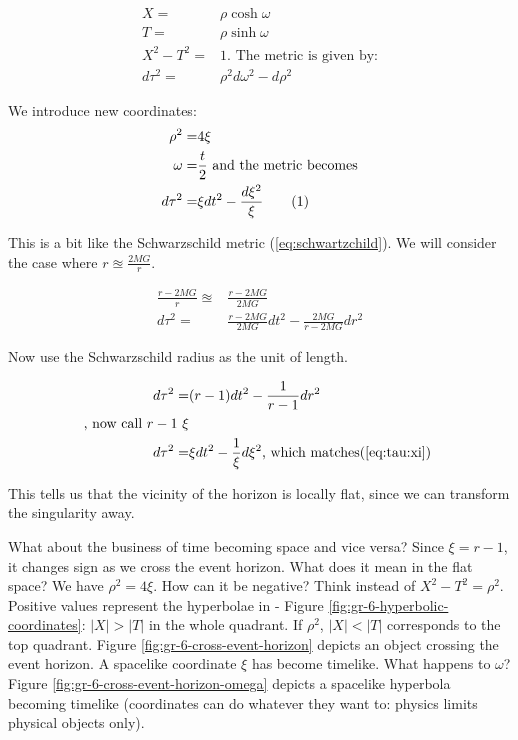 \documentclass[]{article}
\newcommand\numberthis{\addtocounter{equation}{1}\tag{\theequation}}
\begin{document}
{\begin{align*}
	X =& \rho \cosh{\omega} \\
	T =& \rho \sinh{\omega}\\
	X^2 - T^2 =& 1 \text{. The metric is given by:}\\
	d\tau^2 =& \rho^2 d\omega^2 - d \rho^2 
\end{align*}

We introduce new coordinates:
\begin{align*}
	\rho^2 =& 4 \xi\\
	\omega =& \frac{t}{2} \text{ and the metric becomes}\\
	d\tau^2 =& \xi dt^2 - \frac{d \xi^2}{\xi} \numberthis \label{eq:tau:xi}
\end{align*}

This is a bit like the Schwarzschild metric (\ref{eq:schwartzchild}). We will consider the case where $r \approxeq \frac{2MG}{r}$.

\begin{align*}
	\frac{r-2MG}{r} \approxeq & \frac{r-2MG}{2MG}\\
	d \tau^2 =& \frac{r-2MG}{2MG} dt^2 - \frac{2MG}{r-2MG}dr^2
\end{align*}

Now use the Schwarzschild radius as the unit of length.

\begin{align*}
	d \tau^2 =& (r-1) dt^2 - \frac{1}{r-1}dr^2\\ \text{, now call $r-1$ $\xi$}\\
	d \tau^2 =& \xi dt^2 - \frac{1}{\xi} d\xi^2 \text{, which matches(\ref{eq:tau:xi}) }
\end{align*}

This tells us that the vicinity of the horizon is locally flat, since we can transform the singularity away. 

What about the business of time becoming space and vice versa? Since $\xi=r-1$, it changes sign as we cross the event horizon. What does it mean in the flat space? We have $\rho^2 = 4 \xi$. How can it be negative? Think instead of $X^2-T^2=\rho^2$. Positive values represent the hyperbolae in - Figure \ref{fig:gr-6-hyperbolic-coordinates}: $\lvert X\rvert>\lvert T\rvert$ in the whole quadrant. If $\rho^2$, $\lvert X\rvert<\lvert T\rvert$ corresponds to the top quadrant. Figure \ref{fig:gr-6-cross-event-horizon} depicts an object crossing the event horizon. A spacelike coordinate $\xi$ has become timelike. What happens to $\omega$? Figure \ref{fig:gr-6-cross-event-horizon-omega} depicts a spacelike hyperbola becoming timelike (coordinates can do whatever they want to: physics limits physical objects only).

}
\end{document}
